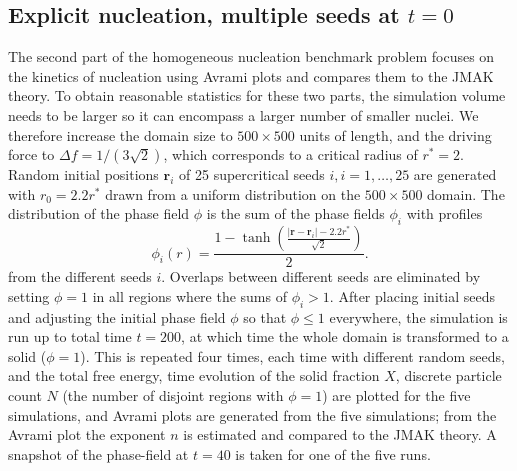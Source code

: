 \documentclass[preprint,12pt]{elsarticle}
\begin{document}
\subsection{Explicit nucleation, multiple seeds at $t=0$}
%
The second part of the homogeneous nucleation benchmark problem focuses on the kinetics of nucleation using Avrami plots and compares them to the JMAK theory. To obtain reasonable statistics for these two parts, the simulation volume needs to be larger so it can encompass a larger number of smaller nuclei. We therefore increase the domain size to $500 \times 500$ units of length, and the driving force to $\Delta f = 1/(3 \sqrt{2})$, which corresponds to a critical radius of $r^*=2$. Random initial positions $\mathbf{r}_i$ of 25 supercritical seeds $i, i=1,\ldots,25$ are generated with $r_0=2.2r^*$ drawn from a uniform distribution on the $500\times500$ domain. The distribution of the phase field $\phi$ is the sum of the phase fields $\phi_i$ with profiles
\begin{equation}
    \phi_i(r)=\frac{1-\tanh\left(
    \frac{|\mathbf{r}-\mathbf{r}_i|-2.2r^*}{\sqrt{2}}
    \right)}{2}.
    \label{eqn:phitr_3}
\end{equation}
%
from the different seeds $i$. Overlaps between different seeds are eliminated by setting $\phi=1$ in all regions where the sums of $\phi_i >1$. After placing initial seeds and adjusting the initial phase field $\phi$ so that $\phi\leq1$ everywhere, the simulation is run up to total time $t=200$, at which time the whole domain is transformed to a solid ($\phi=1$).  This is repeated four times, each time with different random seeds, and the total free energy, time evolution of the solid fraction $X$, discrete particle count $N$  (the number of disjoint regions with $\phi=1$) are plotted for the five simulations, and Avrami plots are generated from the five simulations; from the Avrami plot the exponent $n$ is estimated and compared to the JMAK theory. A snapshot of the phase-field at $t=40$ is taken for one of the five runs.  %
\end{document}
